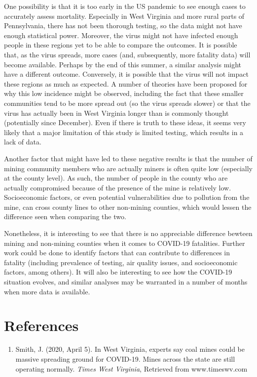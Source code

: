\documentclass[
  12pt,
]{article}
\providecommand{\tightlist}{%
  \setlength{\itemsep}{0pt}\setlength{\parskip}{0pt}}
\begin{document}
One possibility is that it is too early in the US pandemic to see enough
cases to accurately assess mortality. Especially in West Virginia and
more rural parts of Pennsylvania, there has not been thorough testing,
so the data might not have enough statistical power. Moreover, the virus
might not have infected enough people in these regions yet to be able to
compare the outcomes. It is possible that, as the virus spreads, more
cases (and, subsequently, more fatality data) will become available.
Perhaps by the end of this summer, a similar analysis might have a
different outcome. Conversely, it is possible that the virus will not
impact these regions as much as expected. A number of theories have been
proposed for why this low incidence might be observed, including the
fact that these smaller communities tend to be more spread out (so the
virus spreads slower) or that the virus has actually been in West
Virginia longer than is commonly thought (potentially since December).
Even if there is truth to these ideas, it seems very likely that a major
limitation of this study is limited testing, which results in a lack of
data.

Another factor that might have led to these negative results is that the
number of mining community members who are actually miners is often
quite low (especially at the county level). As such, the number of
people in the county who are actually compromised because of the
presence of the mine is relatively low. Socioeconomic factors, or even
potential vulnerabilities due to pollution from the mine, can cross
county lines to other non-mining counties, which would lessen the
difference seen when comparing the two.

Nonetheless, it is interesting to see that there is no appreciable
difference bewteen mining and non-mining counties when it comes to
COVID-19 fatalities. Further work could be done to identify factors that
can contribute to differences in fatality (including prevalence of
testing, air quality issues, and socioeconomic factors, among others).
It will also be interesting to see how the COVID-19 situation evolves,
and similar analyses may be warranted in a number of months when more
data is available.

\newpage

\hypertarget{references}{%
\section{References}\label{references}}

\begin{enumerate}
\def\labelenumi{\arabic{enumi}.}
\tightlist
\item
  Smith, J. (2020, April 5). In West Virginia, experts say coal mines
  could be massive spreading ground for COVID-19. Mines across the state
  are still operating normally. \emph{Times West Virginia}, Retrieved
  from www.timeswv.com
\end{enumerate}
\end{document}
